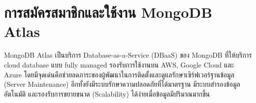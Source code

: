 \vspace*{-0.8in}

    

\section{การสมัครสมาชิกและใช้งาน MongoDB Atlas}

\hspace*{1.3em}
MongoDB Atlas เป็นบริการ Database-as-a-Service (DBaaS) ของ MongoDB ที่ให้บริการ cloud database แบบ fully managed รองรับการใช้งานบน AWS, Google Cloud และ Azure โดยมีจุดเด่นคือช่วยลดภาระของผู้พัฒนาในการติดตั้งและดูแลรักษาเซิร์ฟเวอร์ฐานข้อมูล (Server Maintenance) อีกทั้งยังมีระบบรักษาความปลอดภัยที่ได้มาตรฐาน มีระบบสำรองข้อมูลอัตโนมัติ และรองรับการขยายขนาด (Scalability) ได้ง่ายเมื่อข้อมูลมีปริมาณมากขึ้น

